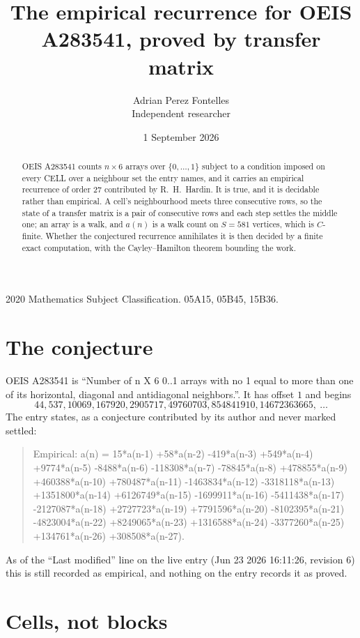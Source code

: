 \documentclass[11pt,a4paper]{article}
\title{The empirical recurrence for OEIS A283541, proved by transfer matrix}
\author{Adrian Perez Fontelles\\ \small Independent researcher}
\date{1 September 2026}
\theoremstyle{plain}
\theoremstyle{definition}
\begin{document}
\maketitle

\begin{abstract}
OEIS A283541 counts $n\times6$ arrays over $\{0,\dots,1\}$ subject to a condition imposed on
every CELL over a neighbour set the entry names, and it carries an empirical recurrence of
order $27$ contributed by R.~H.~Hardin. It is true, and it is decidable rather than
empirical. A cell's neighbourhood meets three consecutive rows, so the state of a transfer
matrix is a pair of consecutive rows and each step settles the middle one; an array is a
walk, and $a(n)$ is a walk count on $S=581$ vertices, which is $C$-finite. Whether the
conjectured recurrence annihilates it is then decided by a finite exact computation, with the
Cayley--Hamilton theorem bounding the work.
\end{abstract}

\noindent\small 2020 Mathematics Subject Classification. 05A15, 05B45, 15B36.\normalsize

\section{The conjecture}

OEIS A283541 is ``Number of n X 6 0..1 arrays with no 1 equal to more than one of its horizontal, diagonal and antidiagonal neighbors.''. It has offset $1$ and begins
\[
44, 537, 10069, 167920, 2905717, 49760703, 854841910, 14672363665,\ \dots
\]
The entry states, as a conjecture contributed by its author and never marked settled:
\begin{quote}
Empirical: a(n) = 15*a(n-1) +58*a(n-2) -419*a(n-3) +549*a(n-4) +9774*a(n-5) -8488*a(n-6) -118308*a(n-7) -78845*a(n-8) +478855*a(n-9) +460388*a(n-10) +780487*a(n-11) -1463834*a(n-12) -3318118*a(n-13) +1351800*a(n-14) +6126749*a(n-15) -1699911*a(n-16) -5411438*a(n-17) -2127087*a(n-18) +2727723*a(n-19) +7791596*a(n-20) -8102395*a(n-21) -4823004*a(n-22) +8249065*a(n-23) +1316588*a(n-24) -3377260*a(n-25) +134761*a(n-26) +308508*a(n-27).
\end{quote}
As of the ``Last modified'' line on the live entry (Jun 23 2026 16:11:26, revision 6) this is still
recorded as empirical, and nothing on the entry records it as proved.

\section{Cells, not blocks}
\end{document}
